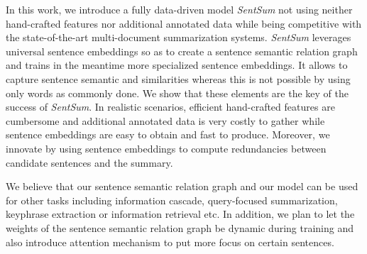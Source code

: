 \documentclass{article}
\begin{document}


In this work, we introduce a fully data-driven model \textit{SentSum} not using neither hand-crafted features nor additional annotated data while being competitive with the state-of-the-art multi-document summarization systems. \textit{SentSum} leverages universal sentence embeddings so as to create a sentence semantic relation graph and trains in the meantime more specialized sentence embeddings. It allows to capture sentence semantic and similarities whereas this is not possible by using only words as commonly done. We show that these elements are the key of the success of \textit{SentSum}. In realistic scenarios, efficient hand-crafted features are cumbersome and additional annotated data is very costly to gather while sentence embeddings are easy to obtain and fast to produce. Moreover, we innovate by using sentence embeddings to compute redundancies between candidate sentences and the summary.

We believe that our sentence semantic relation graph and our model can be used for other tasks including information cascade, query-focused summarization, keyphrase extraction or information retrieval etc. In addition, we plan to let the weights of the sentence semantic relation graph be dynamic during training and also introduce attention mechanism to put more focus on certain sentences.


\end{document}
